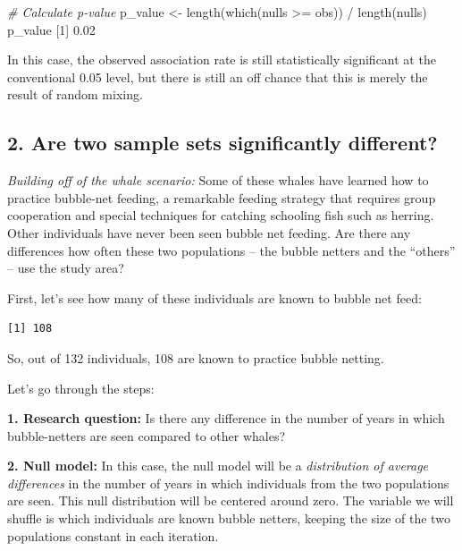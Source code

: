 \documentclass[
]{book}
\newenvironment{Shaded}{\begin{snugshade}}{\end{snugshade}}
\newcommand{\CommentTok}[1]{\textcolor[rgb]{0.56,0.35,0.01}{\textit{#1}}}
\newcommand{\DecValTok}[1]{\textcolor[rgb]{0.00,0.00,0.81}{#1}}
\newcommand{\FloatTok}[1]{\textcolor[rgb]{0.00,0.00,0.81}{#1}}
\newcommand{\FunctionTok}[1]{\textcolor[rgb]{0.00,0.00,0.00}{#1}}
\newcommand{\NormalTok}[1]{#1}
\newcommand{\OtherTok}[1]{\textcolor[rgb]{0.56,0.35,0.01}{#1}}
\newcommand{\SpecialCharTok}[1]{\textcolor[rgb]{0.00,0.00,0.00}{#1}}
\begin{document}
\begin{Shaded}
\begin{Highlighting}[]

\CommentTok{\# Calculate p{-}value}
\NormalTok{p\_value }\OtherTok{\textless{}{-}} \FunctionTok{length}\NormalTok{(}\FunctionTok{which}\NormalTok{(nulls }\SpecialCharTok{\textgreater{}=}\NormalTok{ obs)) }\SpecialCharTok{/} \FunctionTok{length}\NormalTok{(nulls)}
\NormalTok{p\_value}
\NormalTok{[}\DecValTok{1}\NormalTok{] }\FloatTok{0.02}
\end{Highlighting}
\end{Shaded}

In this case, the observed association rate is still statistically significant at the conventional 0.05 level, but there is still an off chance that this is merely the result of random mixing.

\hypertarget{are-two-sample-sets-significantly-different}{%
\subsection*{2. Are two sample sets significantly different?}\label{are-two-sample-sets-significantly-different}}

\emph{Building off of the whale scenario:} Some of these whales have learned how to practice bubble-net feeding, a remarkable feeding strategy that requires group cooperation and special techniques for catching schooling fish such as herring. Other individuals have never been seen bubble net feeding. Are there any differences how often these two populations -- the bubble netters and the ``others'' -- use the study area?

First, let's see how many of these individuals are known to bubble net feed:

\begin{verbatim}
[1] 108
\end{verbatim}

So, out of 132 individuals, 108 are known to practice bubble netting.

Let's go through the steps:

\textbf{1. Research question:} Is there any difference in the number of years in which bubble-netters are seen compared to other whales?

\textbf{2. Null model:} In this case, the null model will be a \emph{distribution of average differences} in the number of years in which individuals from the two populations are seen. This null distribution will be centered around zero. The variable we will shuffle is which individuals are known bubble netters, keeping the size of the two populations constant in each iteration.
\end{document}
